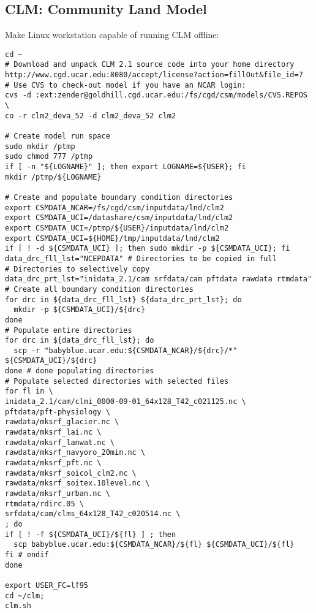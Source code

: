 \documentclass[12pt,twoside]{article}
\begin{document}
\subsection{CLM: Community Land Model}
Make Linux workstation capable of running CLM offline:
\begin{verbatim}
cd ~
# Download and unpack CLM 2.1 source code into your home directory
http://www.cgd.ucar.edu:8080/accept/license?action=fillOut&file_id=7
# Use CVS to check-out model if you have an NCAR login:
cvs -d :ext:zender@goldhill.cgd.ucar.edu:/fs/cgd/csm/models/CVS.REPOS \
co -r clm2_deva_52 -d clm2_deva_52 clm2

# Create model run space
sudo mkdir /ptmp
sudo chmod 777 /ptmp
if [ -n "${LOGNAME}" ]; then export LOGNAME=${USER}; fi
mkdir /ptmp/${LOGNAME}

# Create and populate boundary condition directories
export CSMDATA_NCAR=/fs/cgd/csm/inputdata/lnd/clm2
export CSMDATA_UCI=/datashare/csm/inputdata/lnd/clm2
export CSMDATA_UCI=/ptmp/${USER}/inputdata/lnd/clm2
export CSMDATA_UCI=${HOME}/tmp/inputdata/lnd/clm2
if [ ! -d ${CSMDATA_UCI} ]; then sudo mkdir -p ${CSMDATA_UCI}; fi
data_drc_fll_lst="NCEPDATA" # Directories to be copied in full
# Directories to selectively copy
data_drc_prt_lst="inidata_2.1/cam srfdata/cam pftdata rawdata rtmdata"
# Create all boundary condition directories
for drc in ${data_drc_fll_lst} ${data_drc_prt_lst}; do
  mkdir -p ${CSMDATA_UCI}/${drc}
done
# Populate entire directories
for drc in ${data_drc_fll_lst}; do
  scp -r "babyblue.ucar.edu:${CSMDATA_NCAR}/${drc}/*" ${CSMDATA_UCI}/${drc}
done # done populating directories
# Populate selected directories with selected files
for fl in \
inidata_2.1/cam/clmi_0000-09-01_64x128_T42_c021125.nc \
pftdata/pft-physiology \
rawdata/mksrf_glacier.nc \
rawdata/mksrf_lai.nc \
rawdata/mksrf_lanwat.nc \
rawdata/mksrf_navyoro_20min.nc \
rawdata/mksrf_pft.nc \
rawdata/mksrf_soicol_clm2.nc \
rawdata/mksrf_soitex.10level.nc \
rawdata/mksrf_urban.nc \
rtmdata/rdirc.05 \
srfdata/cam/clms_64x128_T42_c020514.nc \
; do
if [ ! -f ${CSMDATA_UCI}/${fl} ] ; then 
  scp babyblue.ucar.edu:${CSMDATA_NCAR}/${fl} ${CSMDATA_UCI}/${fl}
fi # endif
done

export USER_FC=lf95
cd ~/clm;
clm.sh
\end{verbatim}
\clearpage
\end{document}
